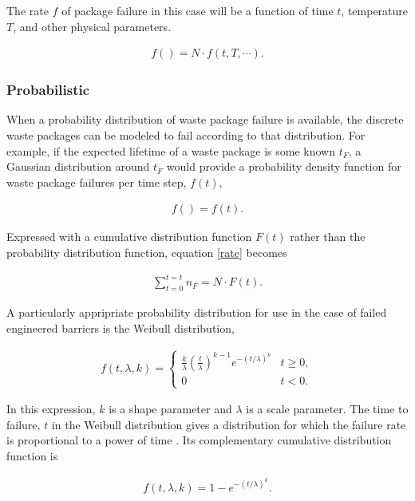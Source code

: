 The rate $f$ of package  failure in this case will be a function of time $t$, 
temperature $T$, and other physical parameters.

\begin{align}
  f() = N\cdot f(t,T,\cdots).
  \label{rate}
\end{align}

\subsubsection{Probabilistic}

When a probability distribution of waste package failure is available, the 
discrete waste packages can be modeled to fail according to that distribution. 
For example, if the expected lifetime of a waste package is some known $t_F$, a 
Gaussian distribution around $t_F$ would provide a probability density function 
for waste package failures per time step, $f(t)$,

\begin{align}
  f()=f(t).
  \label{probabilistic}
\end{align}

Expressed with a cumulative distribution function $F(t)$ rather than the
probability distribution function, equation \eqref{rate} becomes 


\begin{align}
  \sum_{t=0}^{t=t}n_F=N\cdot F(t).
  \label{cdf}
\end{align}


A particularly appripriate probability distribution for use in the case of failed 
engineered barriers is the Weibull distribution, 

\begin{align}
  f(t,\lambda,k) =  \begin{cases}
    \frac{k}{\lambda}\left(\frac{t}{\lambda}\right)^{k-1}e^{-(t/\lambda)^{k}} & 
    t\geq0 ,\\
    0 & t<0 .\end{cases}
  \label{weibullpdf}
\end{align}


In this expression, $k$ is a shape parameter and $\lambda$ is a scale
parameter. The time to failure, $t$ in the Weibull distribution gives a 
distribution for which the failure rate is proportional to a power of time 
\cite{papoulis_probability_2002}. Its complementary cumulative distribution
function is 

\begin{align}
  f(t,\lambda,k) = 1-e^{-(t/\lambda)^k}.
  \label{weibullcdf}
\end{align}

